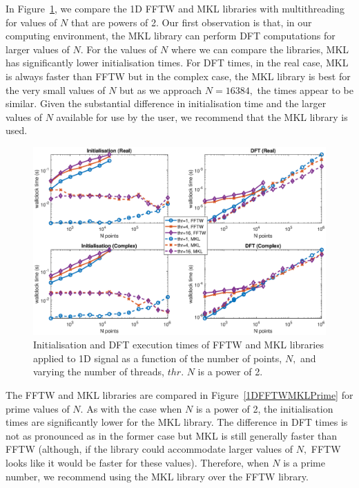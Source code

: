 \documentclass[a4paper]{article}
\begin{document}
In Figure~\ref{1DFFTWMKL2}, we compare the 1D FFTW and MKL libraries
with multithreading for values of $N$ that are powers of 2. Our
first observation is that, in our computing environment, the MKL
library can perform DFT computations for larger values of $N.$ For the
values of $N$ where we can compare the libraries, MKL has
significantly lower initialisation times. For DFT times, in the real
case, MKL is always faster than FFTW but in the complex case, the MKL
library is best for the very small values of $N$ but as we approach
$N=16384,$ the times appear to be similar. Given the substantial
difference in initialisation time and the larger values of $N$
available for use by the user, we recommend that the MKL library is
used.



\begin{figure}[!htb]
    \centering
    \includegraphics[width=0.9\linewidth]{../results/fftw_mkl_2_1d_thr.eps}
  \caption{Initialisation and DFT execution times of FFTW and MKL libraries applied to 1D signal as a function of the
    number of points, $N,$ and varying the number of threads, $thr.$ $N$ is a power of 2.}
  \label{1DFFTWMKL2}
\end{figure}



The FFTW and MKL libraries are compared in Figure~\ref{1DFFTWMKLPrime}
for prime values of $N.$ As with the case when $N$ is a power of 2,
the initialisation times are significantly lower for the MKL
library. The difference in DFT times is not as pronounced as in the
former case but MKL is still generally faster than FFTW (although, if
the library could accommodate larger values of $N,$ FFTW looks like it
would be faster for these values). Therefore, when $N$ is a prime
number, we recommend using the MKL library over the FFTW library.
\end{document}
